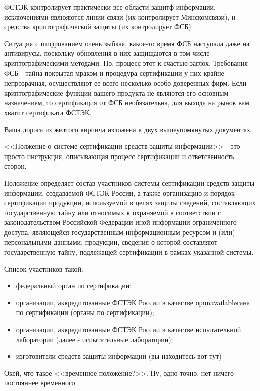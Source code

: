 ФСТЭК контролирует практически все области защитф информации, исключениями явлюяются линии связи (их контролирует Минскомсвязи), и средства криптографической защиты (их контролирует ФСБ).

Ситуация с шифрованием очень зыбкая, какое-то время ФСБ наступала даже на антивирусы, поскольку обновления в них защищаются в том числе криптографическими методами. Но, процесс этот к счастью заглох. Требования ФСБ - тайна покрытая мраком и процедура сертификации у них крайне непрозрачная, осуществляют ее всего несколько особо доверенных фирм. Если криптографические функции вашего продукта не являются его основным назначением, то сертификация от ФСБ необязательна, для выхода на рынок вам хватит сертификата ФСТЭК.

Ваша дорога из желтого кирпича изложена в двух вышеупомянутых документах.

<<Полжение о системе сертификации средств защиты информации>> - это просто инструкция, описывающая процесс сертификации и ответсвенность сторон.

Положение определяет состав участников системы сертификации средств защиты информации, создаваемой ФСТЭК России, а также организацию и порядок сертификации продукции, используемой в целях защиты сведений, составляющих государственную тайну или относимых к охраняемой в соответствии с законодательством Российской Федерации иной информации ограниченного доступа, являющейся государственным информационным ресурсом и (или) персональными данными, продукции, сведения о которой составляют государственную тайну, подлежащей сертификации в рамках указанной системы.

Список участников такой:
\begin{itemize}
    \item федеральный орган по сертификации;
    \item организации, аккредитованные ФСТЭК России в качестве орunavailableгана по сертификации (органы по сертификации);
    \item организации, аккредитованные ФСТЭК России в качестве испытательной лаборатории (далее - испытательные лаборатории);
    \item изготовители средств защиты информации (вы находитесь вот тут)
\end{itemize}
Окей, что такое <<временное положение?>>. Ну, одно точно, нет ничего постояннее временного.

